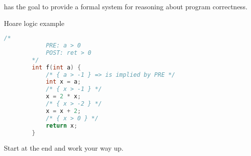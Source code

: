 has the goal to provide a formal system for reasoning about program correctness.
\begin{exampleblock}{Hoare logic example}
    \begin{lstlisting}[language=c]
        /*
            PRE: a > 0
            POST: ret > 0
        */
        int f(int a) {
            /* { a > -1 } => is implied by PRE */
            int x = a;
            /* { x > -1 } */
            x = 2 * x;
            /* { x > -2 } */
            x = x + 2;
            /* { x > 0 } */
            return x;
        }
    \end{lstlisting}
    Start at the end and work your way up.
\end{exampleblock}
